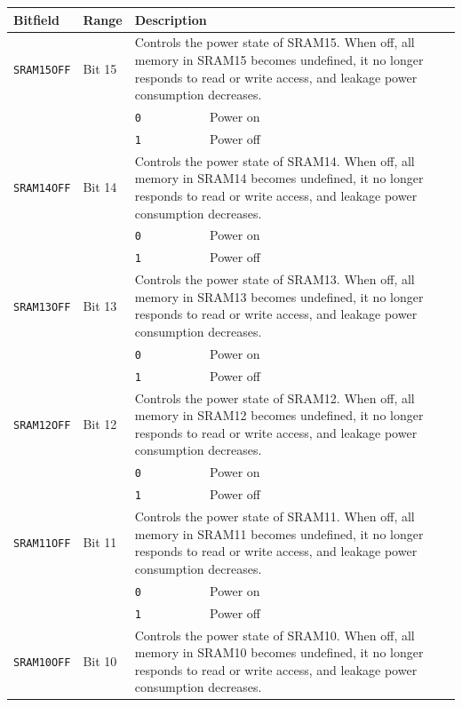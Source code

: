 \begin{tabularx}{\textwidth}{ l l l X }
\textbf{Bitfield} & \textbf{Range} & \multicolumn{2}{X}{\textbf{Description}} \\ \hline
\texttt{SRAM15OFF} & Bit 15 & \multicolumn{2}{X}{Controls the power state of SRAM15. When off, all memory in SRAM15 becomes undefined, it no longer responds to read or write access, and leakage power consumption decreases.} \\
 & & \texttt{0} & Power on \\
 & & \cellcolor{tablehighlightcolor}\texttt{1} & \cellcolor{tablehighlightcolor}Power off \\
\hline
\texttt{SRAM14OFF} & Bit 14 & \multicolumn{2}{X}{Controls the power state of SRAM14. When off, all memory in SRAM14 becomes undefined, it no longer responds to read or write access, and leakage power consumption decreases.} \\
 & & \texttt{0} & Power on \\
 & & \cellcolor{tablehighlightcolor}\texttt{1} & \cellcolor{tablehighlightcolor}Power off \\
\hline
\texttt{SRAM13OFF} & Bit 13 & \multicolumn{2}{X}{Controls the power state of SRAM13. When off, all memory in SRAM13 becomes undefined, it no longer responds to read or write access, and leakage power consumption decreases.} \\
 & & \texttt{0} & Power on \\
 & & \cellcolor{tablehighlightcolor}\texttt{1} & \cellcolor{tablehighlightcolor}Power off \\
\hline
\texttt{SRAM12OFF} & Bit 12 & \multicolumn{2}{X}{Controls the power state of SRAM12. When off, all memory in SRAM12 becomes undefined, it no longer responds to read or write access, and leakage power consumption decreases.} \\
 & & \texttt{0} & Power on \\
 & & \cellcolor{tablehighlightcolor}\texttt{1} & \cellcolor{tablehighlightcolor}Power off \\
\hline
\texttt{SRAM11OFF} & Bit 11 & \multicolumn{2}{X}{Controls the power state of SRAM11. When off, all memory in SRAM11 becomes undefined, it no longer responds to read or write access, and leakage power consumption decreases.} \\
 & & \texttt{0} & Power on \\
 & & \cellcolor{tablehighlightcolor}\texttt{1} & \cellcolor{tablehighlightcolor}Power off \\
\hline
\texttt{SRAM10OFF} & Bit 10 & \multicolumn{2}{X}{Controls the power state of SRAM10. When off, all memory in SRAM10 becomes undefined, it no longer responds to read or write access, and leakage power consumption decreases.} \\

\end{tabularx}

